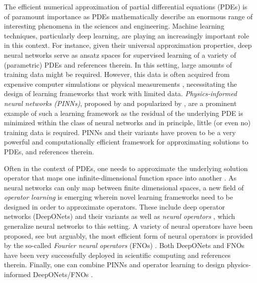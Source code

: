 \documentclass{article}
\numberwithin{equation}{section}
\newcommand{\1}{\mathbbm{1}}
\begin{document}
 The efficient numerical approximation of partial differential equations (PDEs) is of paramount importance as PDEs mathematically describe an enormous range of interesting phenomena in the sciences and engineering. Machine learning techniques, particularly deep learning, are playing an increasingly important role in this context. For instance, given their universal approximation properties, deep neural networks serve as ansatz spaces for supervised learning of a variety of (parametric) PDEs \cite{HEJ1,SZ1, Kuty,LMR1,LMPR1} and references therein. In this setting, large amounts of training data might be required. However, this data is often acquired from expensive computer simulations  or physical measurements \cite{LMR1}, necessitating the design of learning frameworks that work with limited data.  \emph{Physics-informed neural networks (PINNs)}, proposed by \cite{DPT,Lag1,Lag2} and popularized by \cite{KAR1,KAR2}, 
are a prominent example of such a learning framework as the residual of the underlying PDE is minimized within the class of neural networks and in principle, little (or even no) training data is required. PINNs and their variants have proven to be a very powerful and computationally efficient framework for approximating solutions to PDEs, \cite{KAR4,KAR5,KAR6,KAR7,KAR8,jag1,jag2,MM1,MM2,MM3,BKMM1} and references therein.

Often in the context of PDEs, one needs to approximate the underlying solution operator that maps one infinite-dimensional function space into another \cite{guss2019universal,NO}. As neural networks can only map between finite dimensional spaces, a new field of \emph{operator learning} is emerging wherein novel learning frameworks need to be designed in order to approximate operators. These include deep operator networks (DeepONets) \cite{ChenChen1995,deeponets} and their variants as well as \emph{neural operators} \cite{NO}, which generalize neural networks to this setting. A variety of neural operators have been proposed, see \cite{GKO,Mpole} but arguably, the most efficient form of neural operators is provided by the so-called \emph{Fourier neural operators} (FNOs) \cite{FNO}. Both DeepONets and FNOs have been very successfully deployed in scientific computing \cite{fair,donet1,donet2,donet3,FNO1,FNO2} and references therein. Finally, one can combine PINNs and operator learning to design physics-informed DeepONets/FNOs \cite{wang2021learning, FNO1,wang2021long, goswami2022physics}. 
\end{document}
